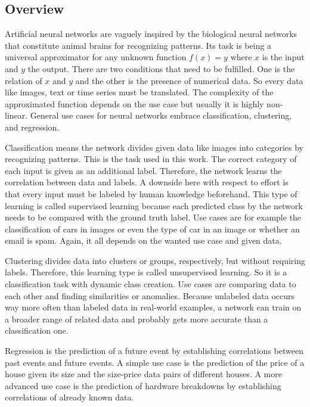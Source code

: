 \subsection{Overview}
\label{sec:neural-networks-overview}
Artificial neural networks are vaguely inspired by the biological neural networks that constitute animal brains for recognizing patterns.
Its task is being a universal approximator for any unknown function $f(x) = y$ where $x$ is the input and $y$ the output.
There are two conditions that need to be fulfilled.
One is the relation of $x$ and $y$ and the other is the presence of numerical data.
So every data like images, text or time series must be translated.
The complexity of the approximated function depends on the use case but usually it is highly non-linear.
General use cases for neural networks embrace classification, clustering, and regression.

Classification means the network divides given data like images into categories by recognizing patterns.
This is the task used in this work.
The correct category of each input is given as an additional label.
Therefore, the network learns the correlation between data and labels.
A downside here with respect to effort is that every input must be labeled by human knowledge beforehand.
This type of learning is called supervised learning because each predicted class by the network needs to be compared with the ground truth label.
Use cases are for example the classification of cars in images or even the type of car in an image or whether an email is spam.
Again, it all depends on the wanted use case and given data.

Clustering divides data into clusters or groups, respectively, but without requiring labels.
Therefore, this learning type is called unsupervised learning.
So it is a classification task with dynamic class creation.
Use cases are comparing data to each other and finding similarities or anomalies.
Because unlabeled data occurs way more often than labeled data in real-world examples, a network can train on a broader range of related data and probably gets more accurate than a classification one.

Regression is the prediction of a future event by establishing correlations between past events and future events.
A simple use case is the prediction of the price of a house given its size and the size-price data pairs of different houses.
A more advanced use case is the prediction of hardware breakdowns by establishing correlations of already known data.